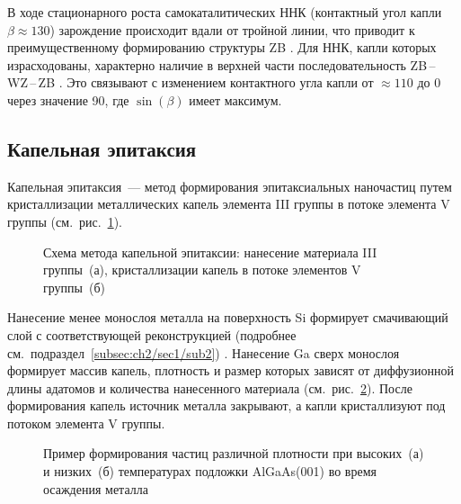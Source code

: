 В ходе стационарного роста самокаталитических ННК (контактный угол капли \(\beta\approx 130\){\textdegree}) зарождение происходит вдали от тройной линии, что приводит к преимущественному формированию структуры ZB \cite{Cirlin2010}. Для ННК, капли которых израсходованы, характерно наличие в верхней части последовательность ZB\,--\,WZ\,--\,ZB \cite{Spirkoska2009, Ambrosini2011}. Это связывают с изменением контактного угла капли от \(\approx 110\){\textdegree} до 0{\textdegree} через значение 90{\textdegree}, где \(\sin(\beta)\) имеет максимум.

\subsection{Капельная эпитаксия}\label{subsec:ch1/sec2/sub6}

Капельная эпитаксия~--- метод формирования эпитаксиальных наночастиц путем кристаллизации металлических капель элемента III группы в потоке элемента V группы (см.~рис.~\cref{fig:Image_8_1}).

\begin{figure}[ht]
	\caption{Схема метода капельной эпитаксии: нанесение материала III группы~(а), кристаллизации капель в потоке элементов V группы~(б) \cite{Gurioli2019}}\label{fig:Image_8_1}
\end{figure}

Нанесение менее монослоя металла на поверхность Si формирует смачивающий слой с соответствующей реконструкцией (подробнее см.~подраздел~\cref{subsec:ch2/sec1/sub2}) \cite{Park1988}. Нанесение Ga сверх монослоя формирует массив капель, плотность и размер которых зависят от диффузионной длины адатомов и количества нанесенного материала (см.~рис.~\cref{fig:Image_8_2}). После формирования капель источник металла закрывают, а капли кристаллизуют под потоком элемента V группы.

\begin{figure}[ht]
	\caption{Пример формирования частиц различной плотности при высоких~(а) и низких~(б) температурах подложки AlGaAs(001) во время осаждения металла \cite{Gurioli2019}}\label{fig:Image_8_2}
\end{figure}

